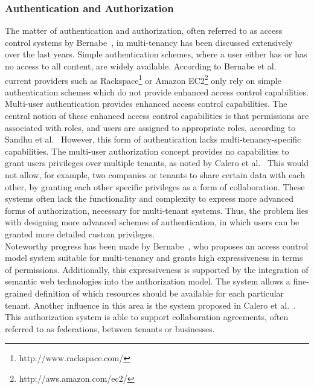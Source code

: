 \subsubsection{Authentication and Authorization}
The matter of authentication and authorization, often referred to as access control systems by Bernabe~\cite{Bernabe2012Auth}, in multi-tenancy has been discussed extensively over the last years. 
Simple authentication schemes, where a user either has or has no access to all content, are widely available.
According to Bernabe et al.~\cite{Bernabe2012Auth} current providers such as Rackspace\footnote{http://www.rackspace.com/} or Amazon EC2\footnote{http://aws.amazon.com/ec2/} only rely on simple authentication schemes which do not provide enhanced access control capabilities. 
Multi-user authentication provides enhanced access control capabilities.
The central notion of these enhanced access control capabilities is that permissions are associated with roles, and users are assigned to appropriate roles, according to Sandhu et al.~\cite{Sandhu1996Auth}
However, this form of authentication lacks multi-tenancy-specific capabilities. 
The multi-user authorization concept provides no capabilities to grant users privileges over multiple tenants, as noted by Calero et al.~\cite{Calero2010Auth}
This would not allow, for example, two companies or tenants to share certain data with each other, by granting each other specific privileges as a form of collaboration.
These systems often lack the functionality and complexity to express more advanced forms of authorization, necessary for multi-tenant systems.
Thus, the problem lies with designing more advanced schemes of authentication, in which users can be granted more detailed custom privileges.\\

Noteworthy progress has been made by Bernabe~\cite{Bernabe2012Auth}, who proposes an access control model system suitable for multi-tenancy and grants high expressiveness in terms of permissions. 
Additionally, this expressiveness is supported by the integration of semantic web technologies into the authorization model. 
The system allows a fine-grained definition of which resources should be available for each particular tenant. 
Another influence in this area is the system proposed in Calero et al.~\cite{Calero2010Auth}. 
This authorization system is able to support collaboration agreements, often referred to as federations, between tenants or businesses.

